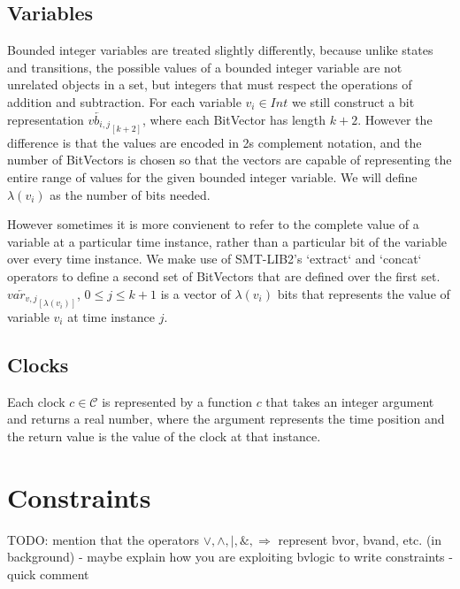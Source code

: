 \documentclass[a4paper,11pt]{article}
\newcommand*\BitAnd{\mathbin{\&}}
\newcommand*\BitOr{\mathbin{|}}
\begin{document}
\subsection{Variables}
\label{sec:org1eadba5}

Bounded integer variables are treated slightly differently, because unlike
states and transitions, the possible values of a bounded integer variable are
not unrelated objects in a set, but integers that must respect the operations of
addition and subtraction. For each variable \(v_i \in Int\) we still construct a
bit representation \(\overleftarrow{vb_{i,j}}_{[k+2]}\), where each BitVector
has length \(k+2\). However the difference is that the values are encoded in 2s
complement notation, and the number of BitVectors is chosen so that the vectors
are capable of representing the entire range of values for the given bounded
integer variable. We will define \(\lambda(v_i)\) as the number of bits needed.

However sometimes it is more convienent to refer to the complete value of a
variable at a particular time instance, rather than a particular bit of the
variable over every time instance. We make use of SMT-LIB2's `extract` and
`concat` operators to define a second set of BitVectors that are defined over
the first set. \(\overleftarrow{var_{v,j}}_{[\lambda(v_i)]}\), \(0 \leq j \leq
k+1\) is a vector of \(\lambda(v_i)\) bits that represents the value of variable
\(v_i\) at time instance \(j\).


\subsection{Clocks}
\label{sec:orga9ead02}

Each clock \(c \in \mathcal{C}\) is represented by a function \(c\) that takes
an integer argument and returns a real number, where the argument represents the
time position and the return value is the value of the clock at that instance.

\section{Constraints}
\label{sec:orge8a2779}
TODO: mention that the operators \(\lor, \land, \BitOr , \BitAnd, \Rightarrow\) represent
bvor, bvand, etc. (in background) -  maybe explain how you are exploiting bvlogic to write constraints - quick comment
\end{document}
